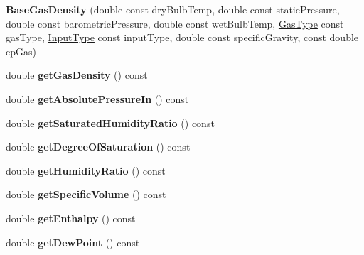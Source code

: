 \begin{DoxyCompactItemize}
\mbox{\label{class_base_gas_density_a08fc6e441bfec806ea73a9e37be60d92}} 
{\bfseries Base\+Gas\+Density} (double const dry\+Bulb\+Temp, double const static\+Pressure, double const barometric\+Pressure, double const wet\+Bulb\+Temp, \hyperlink{class_base_gas_density_afb215e48f6193462521b7e8d47306ed3}{Gas\+Type} const gas\+Type, \hyperlink{class_base_gas_density_a54f846cc4683a49d3904a40fe2986772}{Input\+Type} const input\+Type, double const specific\+Gravity, const double cp\+Gas)
\item 
\mbox{\label{class_base_gas_density_a1cbf2591aecb384afd5843f0e4a62a4e}} 
double {\bfseries get\+Gas\+Density} () const
\item 
\mbox{\label{class_base_gas_density_a7e99fc6b2f9ecf0399f05fb758499f88}} 
double {\bfseries get\+Absolute\+Pressure\+In} () const
\item 
\mbox{\label{class_base_gas_density_a11a91417432593ac1020265dc4836ee3}} 
double {\bfseries get\+Saturated\+Humidity\+Ratio} () const
\item 
\mbox{\label{class_base_gas_density_aa6ea4360eda19076a8d074a4ab798278}} 
double {\bfseries get\+Degree\+Of\+Saturation} () const
\item 
\mbox{\label{class_base_gas_density_a5b7afba9ca1aaf9ef5df56fea9f901bd}} 
double {\bfseries get\+Humidity\+Ratio} () const
\item 
\mbox{\label{class_base_gas_density_af641ae2a0142ac83a21224108a087c50}} 
double {\bfseries get\+Specific\+Volume} () const
\item 
\mbox{\label{class_base_gas_density_a0180adfa955225f6044cb4c7145b9919}} 
double {\bfseries get\+Enthalpy} () const
\item 
\mbox{\label{class_base_gas_density_afd2e1ee6bd8d830be9fc0342709d7a37}} 
double {\bfseries get\+Dew\+Point} () const
\item 
\mbox{\label{class_base_gas_density_a2975d7c69747df8fde8a84fca540a435}} 

\end{DoxyCompactItemize}
